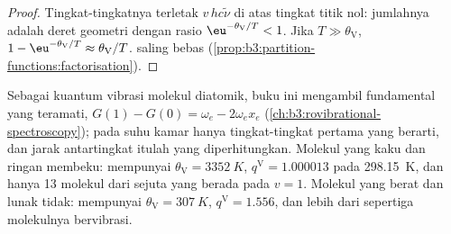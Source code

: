 \begin{proof}
Tingkat-tingkatnya terletak $v\,hc\tilde\nu$ di atas tingkat titik nol: jumlahnya
adalah deret geometri dengan rasio $\eu^{-\theta_{\mathrm V}/T} < 1$. Jika
$T \gg \theta_{\mathrm V}$, $1 - \eu^{-\theta_{\mathrm V}/T} \approx \theta_{\mathrm V}/T$.
 saling bebas (\cref{prop:b3:partition-functions:factorisation}).
\end{proof}

Sebagai kuantum vibrasi molekul diatomik, buku ini mengambil fundamental yang
teramati, $G(1) - G(0) = \omega_e - 2\omega_ex_e$
(\cref{ch:b3:rovibrational-spectroscopy}); pada suhu kamar hanya tingkat-tingkat
pertama yang berarti, dan jarak antartingkat itulah yang diperhitungkan.
Molekul yang kaku dan ringan membeku:  mempunyai
$\theta_{\mathrm V} = \qty{3352}{K}$, $q^{\mathrm V} = 1.000013$ pada \qty{298.15}{K}, dan
hanya 13 molekul dari sejuta yang berada pada $v = 1$. Molekul yang berat dan
lunak tidak:  mempunyai $\theta_{\mathrm V} = \qty{307}{K}$, $q^{\mathrm V} = 1.556$,
dan lebih dari sepertiga molekulnya bervibrasi.

